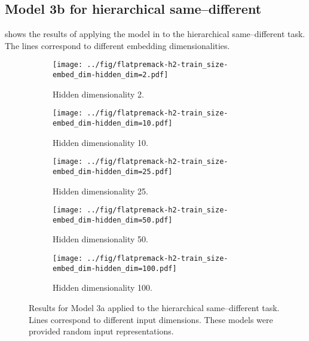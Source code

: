 \subsection{Model 3b for hierarchical same--different}

 shows the results of applying the model in  to the hierarchical same--different task. The lines correspond to different embedding dimensionalities.

\begin{figure}[H]
  \centering

  \begin{subfigure}{0.45\linewidth}
    \texttt{[image: ../fig/flatpremack-h2-train\_size-embed\_dim-hidden\_dim=2.pdf]}
    \caption{Hidden dimensionality 2.}
  \end{subfigure}
  \hfill
  \begin{subfigure}{0.45\linewidth}
    \texttt{[image: ../fig/flatpremack-h2-train\_size-embed\_dim-hidden\_dim=10.pdf]}
    \caption{Hidden dimensionality 10.}
  \end{subfigure}

  \vspace{24pt}

  \begin{subfigure}{0.45\linewidth}
    \texttt{[image: ../fig/flatpremack-h2-train\_size-embed\_dim-hidden\_dim=25.pdf]}
    \caption{Hidden dimensionality 25.}
  \end{subfigure}
  \hfill
  \begin{subfigure}{0.45\linewidth}
    \texttt{[image: ../fig/flatpremack-h2-train\_size-embed\_dim-hidden\_dim=50.pdf]}
    \caption{Hidden dimensionality 50.}
  \end{subfigure}

  \vspace{24pt}

  \begin{subfigure}{0.45\linewidth}
    \texttt{[image: ../fig/flatpremack-h2-train\_size-embed\_dim-hidden\_dim=100.pdf]}
    \caption{Hidden dimensionality 100.}
    \label{fig:model3a-rep}
  \end{subfigure}
  \caption{Results for Model 3a applied to the hierarchical same--different task. Lines correspond to different input dimensions. These models were provided random input representations.}
  \label{fig:model3a}
\end{figure}

